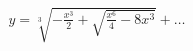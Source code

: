 \documentclass[preview]{standalone}
\begin{document}
\begin{align*}
y = \sqrt[3]{-\frac{x^3}{2} + \sqrt{\frac{x^6}{4} - 8x^3}} + \dots
\end{align*}
\end{document}
